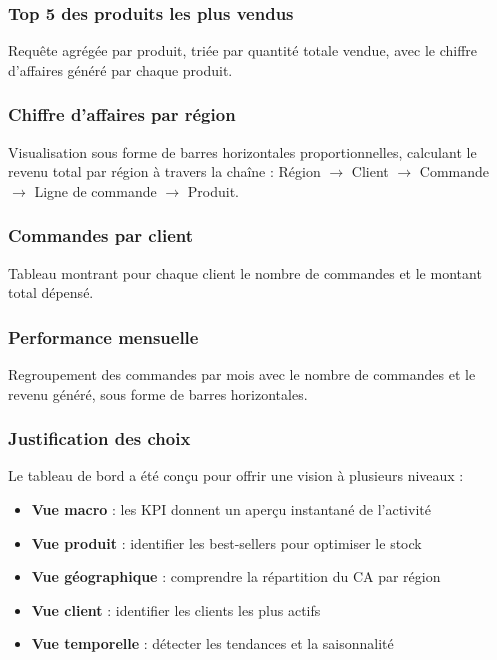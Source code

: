 \documentclass[12pt,a4paper]{article}
\begin{document}
\subsubsection{Top 5 des produits les plus vendus}
Requ\^ete agr\'eg\'ee par produit, tri\'ee par quantit\'e totale vendue, avec le chiffre d'affaires g\'en\'er\'e par chaque produit.

\subsubsection{Chiffre d'affaires par r\'egion}
Visualisation sous forme de barres horizontales proportionnelles, calculant le revenu total par r\'egion \`a travers la cha\^ine : R\'egion $\rightarrow$ Client $\rightarrow$ Commande $\rightarrow$ Ligne de commande $\rightarrow$ Produit.

\subsubsection{Commandes par client}
Tableau montrant pour chaque client le nombre de commandes et le montant total d\'epens\'e.

\subsubsection{Performance mensuelle}
Regroupement des commandes par mois avec le nombre de commandes et le revenu g\'en\'er\'e, sous forme de barres horizontales.

\subsubsection{Justification des choix}
Le tableau de bord a \'et\'e con\c{c}u pour offrir une vision \`a plusieurs niveaux :
\begin{itemize}
    \item \textbf{Vue macro} : les KPI donnent un aper\c{c}u instantan\'e de l'activit\'e
    \item \textbf{Vue produit} : identifier les best-sellers pour optimiser le stock
    \item \textbf{Vue g\'eographique} : comprendre la r\'epartition du CA par r\'egion
    \item \textbf{Vue client} : identifier les clients les plus actifs
    \item \textbf{Vue temporelle} : d\'etecter les tendances et la saisonnalit\'e
\end{itemize}
\end{document}
